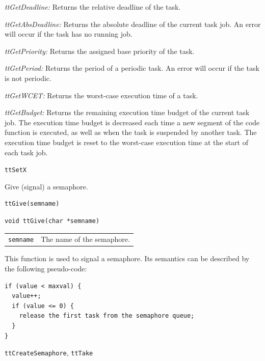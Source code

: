 \documentclass[final,twoside]{rapport}
\begin{document}
{\it ttGetDeadline:} Returns the relative deadline of the task.

{\it ttGetAbsDeadline:} Returns the absolute deadline of the current
task job. An error will occur if the task has no running job.

{\it ttGetPriority:} Returns the assigned base priority of the task. 

{\it ttGetPeriod:} Returns the period of a periodic task. An error
will occur if the task is not periodic.

{\it ttGetWCET:} Returns the worst-case execution time of a task. 

{\it ttGetBudget:} Returns the remaining execution time budget of the
current task job. The execution time budget is decreased each
time a new segment of the code function is executed, as well as when
the task is suspended by another task. The execution time budget is
reset to the worst-case execution time at the start of each task job.

\seealso
\texttt{ttSetX} 



\purpose
Give (signal) a semaphore.

\Msyntax
\begin{verbatim}
ttGive(semname)
\end{verbatim}

\Csyntax
\begin{verbatim}
void ttGive(char *semname)
\end{verbatim}

\args
\begin{tabularx}{\hsize}{l>{\raggedright\arraybackslash}X}
  {\tt semname} & The name of the semaphore.\\
\end{tabularx}

\descr This function is used to signal a semaphore. Its semantics can
be described by the following pseudo-code:
\begin{verbatim}
if (value < maxval) {
  value++;
  if (value <= 0) {
    release the first task from the semaphore queue;
  }
}
\end{verbatim}

\seealso
{\tt ttCreateSemaphore}, {\tt ttTake}


\end{document}
